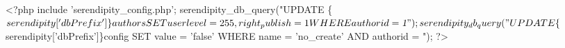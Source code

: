 \begin{ospcode}
<?php
include 'serendipity_config.php';
serendipity_db_query("UPDATE \{$serendipity['dbPrefix']\}authors 
                         SET userlevel     = 255,
                             right_publish = 1
                       WHERE authorid      = \cmdvar{1}");

serendipity_db_query("UPDATE \{$serendipity['dbPrefix']\}config 
                         SET value = 'false'
                       WHERE name  = 'no_create'
                         AND authorid = ");
?>
\end{ospcode}